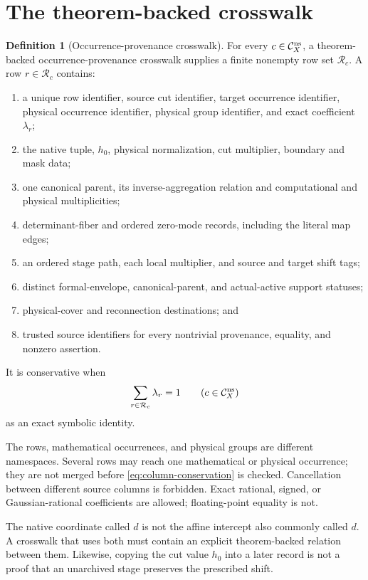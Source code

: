 \documentclass[11pt]{article}
\theoremstyle{definition}
\newtheorem{definition}[theorem]{Definition}
\theoremstyle{remark}
\numberwithin{equation}{section}
\newcommand{\Cns}{\mathcal C_X^{\rm ns}}
\begin{document}
\section{The theorem-backed crosswalk}

\begin{definition}[Occurrence-provenance crosswalk]
\label{def:crosswalk}
For every \(c\in\Cns\), a theorem-backed occurrence-provenance
crosswalk supplies a finite nonempty row set \(\mathcal R_c\).  A row
\(r\in\mathcal R_c\) contains:
\begin{enumerate}[label=(\roman*),leftmargin=2.2em]
\item a unique row identifier, source cut identifier, target
  occurrence identifier, physical occurrence identifier, physical
  group identifier, and exact coefficient \(\lambda_r\);
\item the native tuple, \(h_0\), physical normalization, cut
  multiplier, boundary and mask data;
\item one canonical parent, its inverse-aggregation relation and
  computational and physical multiplicities;
\item determinant-fiber and ordered zero-mode records, including the
  literal map edges;
\item an ordered stage path, each local multiplier, and source and
  target shift tags;
\item distinct formal-envelope, canonical-parent, and actual-active
  support statuses;
\item physical-cover and reconnection destinations; and
\item trusted source identifiers for every nontrivial provenance,
  equality, and nonzero assertion.
\end{enumerate}
It is conservative when
\begin{equation}
 \sum_{r\in\mathcal R_c}\lambda_r=1
 \qquad(c\in\Cns)
 \label{eq:column-conservation}
\end{equation}
as an exact symbolic identity.
\end{definition}

The rows, mathematical occurrences, and physical groups are different
namespaces.  Several rows may reach one mathematical or physical
occurrence; they are not merged before
\eqref{eq:column-conservation} is checked.  Cancellation between
different source columns is forbidden.  Exact rational, signed, or
Gaussian-rational coefficients are allowed; floating-point equality
is not.

The native coordinate called \(d\) is not the affine intercept also
commonly called \(d\).  A crosswalk that uses both must contain an
explicit theorem-backed relation between them.  Likewise, copying
the cut value \(h_0\) into a later record is not a proof that an
unarchived stage preserves the prescribed shift.
\end{document}
